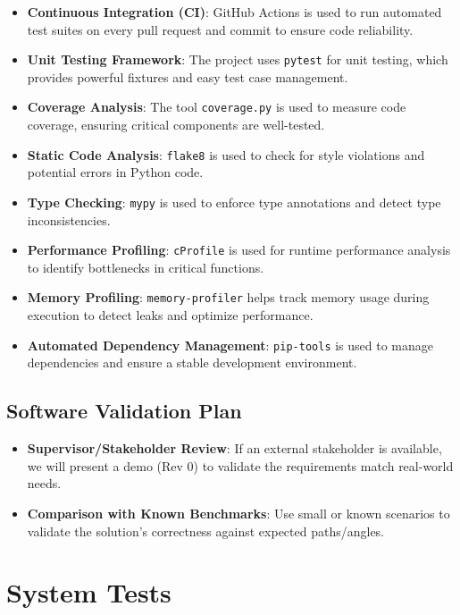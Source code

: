 \documentclass[12pt, titlepage]{article}
\begin{document}
\begin{itemize}
  \item \textbf{Continuous Integration (CI)}: GitHub Actions is used to run automated test suites on every pull request and commit to ensure code reliability.
  \item \textbf{Unit Testing Framework}: The project uses \texttt{pytest} for unit testing, which provides powerful fixtures and easy test case management.
  \item \textbf{Coverage Analysis}: The tool \texttt{coverage.py} is used to measure code coverage, ensuring critical components are well-tested.
  \item \textbf{Static Code Analysis}: \texttt{flake8} is used to check for style violations and potential errors in Python code.
  \item \textbf{Type Checking}: \texttt{mypy} is used to enforce type annotations and detect type inconsistencies.
  \item \textbf{Performance Profiling}: \texttt{cProfile} is used for runtime performance analysis to identify bottlenecks in critical functions.
  \item \textbf{Memory Profiling}: \texttt{memory-profiler} helps track memory usage during execution to detect leaks and optimize performance.
  \item \textbf{Automated Dependency Management}: \texttt{pip-tools} is used to manage dependencies and ensure a stable development environment.
\end{itemize}



\subsection{Software Validation Plan}

\begin{itemize}
  \item \textbf{Supervisor/Stakeholder Review}: If an external stakeholder is available, we will present a demo (Rev 0) to validate the requirements match real-world needs.
  \item \textbf{Comparison with Known Benchmarks}: Use small or known scenarios to validate the solution’s correctness against expected paths/angles.
\end{itemize}

\section{System Tests}
\end{document}
